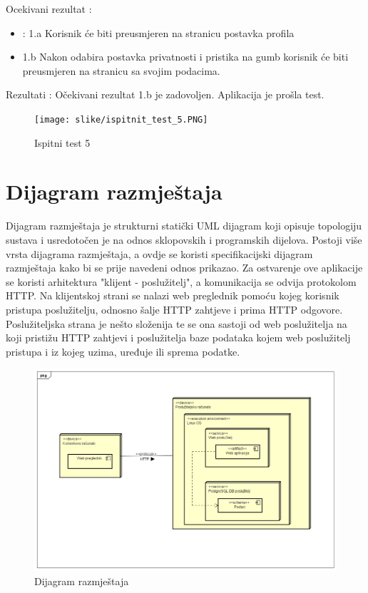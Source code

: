 			\noindent Ocekivani rezultat : 

			\begin{itemize}
				\item : 1.a Korisnik će biti preusmjeren na stranicu postavka profila
				\item   1.b Nakon odabira postavka privatnosti i pristika na gumb korisnik će biti preusmjeren na stranicu sa svojim podacima.
			\end{itemize}
	
			\noindent Rezultati : Očekivani rezultat 1.b je zadovoljen. Aplikacija je prošla test. 

			\begin{figure}[H]
				\texttt{[image: slike/ispitnit\_test\_5.PNG]} %
				\caption{Ispitni test 5}
				\label{fig:Test5} %
			\end{figure}

			\eject 
		
		
		\section{Dijagram razmještaja}
			
			 Dijagram razmještaja je strukturni statički UML dijagram koji opisuje topologiju sustava i usredotočen je na odnos sklopovskih i programskih dijelova. Postoji više vrsta dijagrama razmještaja, a ovdje se koristi specifikacijski dijagram razmještaja kako bi se prije navedeni odnos prikazao. Za ostvarenje ove aplikacije se koristi arhitektura "klijent - poslužitelj", a komunikacija se odvija protokolom HTTP. Na klijentskoj strani se nalazi web preglednik pomoću kojeg korisnik pristupa poslužitelju, odnosno šalje HTTP zahtjeve i prima HTTP odgovore. Poslužiteljska strana je nešto složenija te se ona sastoji od web poslužitelja na koji pristižu HTTP zahtjevi i poslužitelja baze podataka kojem web poslužitelj pristupa i iz kojeg uzima, uređuje ili sprema podatke.
			 
			 \begin{figure}[H]
			 	\includegraphics[width=1\linewidth]{slike/Dijagram_razmjestaja.PNG} %
			 	\caption{Dijagram razmještaja}
			 	\label{fig:dijraz} %
			 \end{figure}
			
